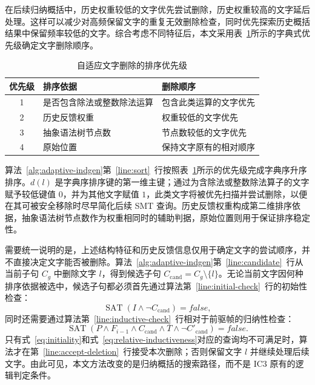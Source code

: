 \documentclass[11pt,a4paper]{article}
\newcommand{\Sat}{\operatorname{SAT}}
\begin{document}
在后续归纳概括中，历史权重较低的文字优先尝试删除，历史权重较高的文字延后处理。这样可以减少对高频保留文字的重复无效删除检查，同时优先探索历史概括结果中保留频率较低的文字。综合考虑不同特征后，本文采用表~\ref{tab:ordering-priority}所示的字典式优先级确定文字删除顺序。

\begin{table}[htbp]
  \centering
  \caption{自适应文字删除的排序优先级}
  \label{tab:ordering-priority}
  \renewcommand{\arraystretch}{1.2}
  \begin{tabularx}{0.88\textwidth}{c p{4.1cm} X}
    \toprule
    优先级 & 排序依据 & 删除顺序 \\
    \midrule
    1 & 是否包含除法或整数除法运算 & 包含此类运算的文字优先 \\
    2 & 历史反馈权重 & 权重较低的文字优先 \\
    3 & 抽象语法树节点数 & 节点数较低的文字优先 \\
    4 & 原始位置 & 保持文字原有的相对顺序 \\
    \bottomrule
  \end{tabularx}
\end{table}

算法~\ref{alg:adaptive-indgen}第~\ref{line:sort}~行按照表~\ref{tab:ordering-priority}所示的优先级完成字典序升序排序。$d(l)$ 是字典序排序键的第一维主键；通过为含除法或整数除法算子的文字赋予较低键值 $0$，并为其他文字赋值 $1$，此类文字将被优先扫描并尝试删除，以便在其可被安全移除时尽早简化后续 SMT 查询。历史反馈权重构成第二维排序依据，抽象语法树节点数作为权重相同时的辅助判据，原始位置则用于保证排序稳定性。

需要统一说明的是，上述结构特征和历史反馈信息仅用于确定文字的尝试顺序，并不直接决定文字能否被删除。算法~\ref{alg:adaptive-indgen}第~\ref{line:candidate}~行从当前子句 $C_g$ 中删除文字 $l$，得到候选子句 $C_{\mathrm{cand}}=C_g\setminus\{l\}$。无论当前文字因何种排序依据被选中，候选子句都必须首先通过算法第~\ref{line:initial-check}~行的初始性检查：
\begin{equation}
  \Sat\!\left(I\land\neg C_{\mathrm{cand}}\right)=\mathit{false},
  \label{eq:initiality}
\end{equation}
同时还需要通过算法第~\ref{line:inductive-check}~行相对于前驱帧的归纳性检查：
\begin{equation}
  \Sat\!\left(P\land F_{i-1}\land C_{\mathrm{cand}}\land T\land
  \neg C'_{\mathrm{cand}}\right)=\mathit{false}.
  \label{eq:relative-inductiveness}
\end{equation}
只有式~\eqref{eq:initiality}和式~\eqref{eq:relative-inductiveness}对应的查询均不可满足时，算法才在第~\ref{line:accept-deletion}~行接受本次删除；否则保留文字 $l$ 并继续处理后续文字。由此可见，本文方法改变的是归纳概括的搜索路径，而不是 IC3 原有的逻辑判定条件。
\end{document}
